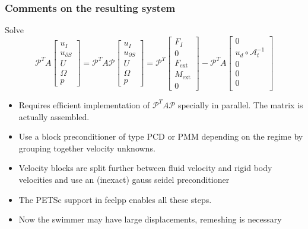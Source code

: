 \documentclass{beamer}
\begin{document}
\begin{frame}
	\frametitle{Comments on the resulting system}

	Solve 
	\begin{equation}
		\mathcal{P}^T A  
		\begin{bmatrix}
			u_I\\
			u_{\partial S} \\
			U \\
			\Omega\\
			p
		\end{bmatrix} 
		=
		\mathcal{P}^T A \mathcal{P} 
		\begin{bmatrix}
			u_I\\
			u_{\partial S} \\
			U \\
			\Omega\\
			p
		\end{bmatrix} 
		= \mathcal{P}^T
		\begin{bmatrix}
			F_I\\
			0 \\
			F_\mathrm{ext} \\
			M_\mathrm{ext}\\
			0
		\end{bmatrix} 
		- \mathcal{P}^T A
		\begin{bmatrix}
		 0\\
		 u_d \circ \mathcal{A}_t^{-1}\\
		 0\\
		 0\\
		 0\\
		\end{bmatrix} 
	\end{equation}
	\begin{itemize}
		\item Requires efficient implementation of $\mathcal{P}^T A \mathcal{P}$ specially in parallel. The matrix is actually assembled.
		\item Use a block preconditioner of type PCD or PMM depending on the regime by grouping together velocity unknowns.
		\item Velocity blocks are split further between fluid velocity and rigid body velocities and use an (inexact)  gauss seidel  preconditioner
		\item The PETSc support in feelpp enables all these steps.
		\item Now the swimmer may have  large displacements, remeshing is necessary
	\end{itemize}

\end{frame}
\end{document}
